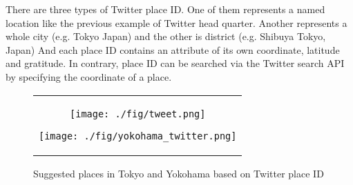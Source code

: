 There are three types of Twitter place ID.
One of them represents a named location like the previous example of Twitter head quarter.
Another represents a whole city (e.g. Tokyo Japan) and the other is district (e.g. Shibuya Tokyo, Japan)
And each place ID contains an attribute of its own coordinate, latitude and gratitude.
In contrary, place ID can be searched via the Twitter search API by specifying the coordinate of a place.

\begin{figure}[ht]
	\begin{center}
		\begin{tabular}{c}
		
			\begin{minipage}{0.33\hsize}
				\begin{center}
					\texttt{[image: ./fig/tweet.png]}
				\end{center}
			\end{minipage}

			\begin{minipage}{0.33\hsize}
				\begin{center}
					\texttt{[image: ./fig/yokohama\_twitter.png]}
				\end{center}
			\end{minipage}

		\end{tabular}
		\caption{Suggested places in Tokyo and Yokohama based on Twitter place ID}
	\label{fig:tweet}
	\end{center}
\end{figure}

\begin{comment}
\begin{figure}
	\centering
	\texttt{[image: ./fig/tweet.png]}
	\caption{Suggested places in Tokyo based on Twitter place ID}
	\label{fig:tweet}
\end{figure}
\end{comment}

